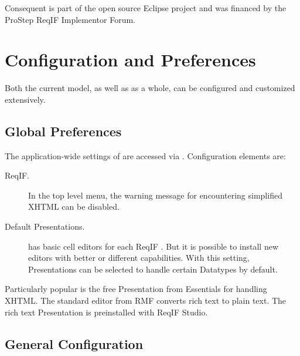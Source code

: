 Consequent is part of the open source Eclipse project and was financed by the ProStep ReqIF Implementor Forum.

\section{Configuration and Preferences}
\label{sec:config-preferences}

Both the current model, as well as \pror{} as a whole, can be configured and customized extensively.

\subsection{Global Preferences}
\label{sec:global-prefs}

The application-wide settings of \pror{} are accessed via .  Configuration elements are:

\begin{description}
\item[ReqIF.] In the top level menu, the warning message for encountering simplified XHTML can be disabled.
\item[Default Presentations.] \pror{} has basic cell editors for each ReqIF .  But it is possible to install new editors with better or different capabilities.  With this setting, Presentations can be selected to handle certain Datatypes by default.
\end{description}

\begin{info}
Particularly popular is the free Presentation from Essentials for handling XHTML.  The standard editor from RMF converts rich text to plain text.  The rich text Presentation is preinstalled with ReqIF Studio.
\end{info}

\subsection{General Configuration}
\label{sec:general_configuration}

